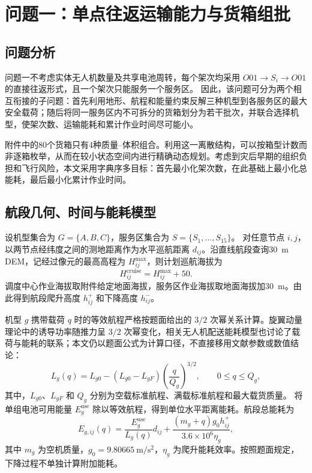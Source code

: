 \section{问题一：单点往返运输能力与货箱组批}

\subsection{问题分析}

问题一不考虑实体无人机数量及共享电池周转，每个架次均采用
$O01\rightarrow S_i\rightarrow O01$ 的直接往返形式，且一个架次只能服务一个服务区。
因此，该问题可分为两个相互衔接的子问题：首先利用地形、航程和能量约束反解三种机型到各服务区的最大安全载荷；随后将同一服务区内不可拆分的货箱划分为若干批次，并联合选择机型，使架次数、运输能耗和累计作业时间尽可能小。

附件中的80个货箱只有4种质量--体积组合。利用这一离散结构，可以按箱型计数而非逐箱枚举，从而在较小状态空间内进行精确动态规划。考虑到灾后早期的组织负担和飞行风险，本文采用字典序多目标：首先最小化架次数，在此基础上最小化总能耗，最后最小化累计作业时间。

\subsection{航段几何、时间与能耗模型}

设机型集合为 $G=\{A,B,C\}$，服务区集合为 $S=\{S_1,\ldots,S_{15}\}$。
对任意节点 $i,j$，以两节点经纬度之间的测地距离作为水平巡航距离 $d_{ij}$。沿直线航段查询30~m DEM，记经过像元的最高高程为 $H_{ij}^{\max}$，则计划巡航海拔为
\begin{equation}
H_{ij}^{\mathrm{cruise}}=H_{ij}^{\max}+50.
\end{equation}
调度中心作业海拔取附件给定地面海拔，服务区作业海拔取地面海拔加30~m。由此得到航段爬升高度 $h_{ij}^{+}$ 和下降高度 $h_{ij}^{-}$。

机型 $g$ 携带载荷 $q$ 时的等效航程严格按题面给出的 $3/2$ 次幂关系计算。旋翼动量理论中的诱导功率随推力呈 $3/2$ 次幂变化，相关无人机配送能耗模型也讨论了载荷与能耗的联系；本文仍以题面公式为计算口径，不直接移用文献参数或数值结论\cite{zhang2021}：
\begin{equation}
L_g(q)=L_{g0}-\left(L_{g0}-L_{gF}\right)
\left(\frac{q}{Q_g}\right)^{3/2},\qquad 0\le q\le Q_g,
\end{equation}
其中，$L_{g0}$、$L_{gF}$ 和 $Q_g$ 分别为空载标准航程、满载标准航程和最大载货质量。
将单组电池可用能量 $E_g^{\mathrm{use}}$ 除以等效航程，得到单位水平距离能耗。航段总能耗为
\begin{equation}
E_{g,ij}(q)=\frac{E_g^{\mathrm{use}}}{L_g(q)}d_{ij}
+\frac{(m_g+q)g_0h_{ij}^{+}}{3.6\times10^6\eta_g},
\end{equation}
其中 $m_g$ 为空机质量，$g_0=9.80665~\mathrm{m/s^2}$，$\eta_g$ 为爬升能耗效率。按照题面规定，下降过程不单独计算附加能耗。


